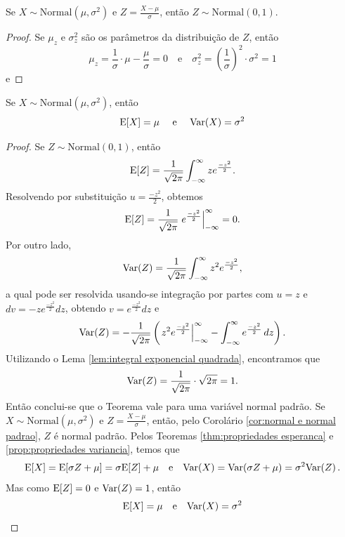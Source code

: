 \begin{cor:normal e normal padrao}
\label{cor:normal e normal padrao}
Se $X \sim \mathrm{Normal}(\mu, \sigma^2)$ e $Z = \frac{X - \mu}{\sigma}$, então
$Z \sim \mathrm{Normal}(0, 1)$.
\end{cor:normal e normal padrao}
\begin{proof}
Se $\mu_z$ e $\sigma^2_z$ são os parâmetros da distribuição de $Z$, então
\[
    \mu_z = \frac{1}{\sigma} \cdot \mu - \frac{\mu}{\sigma} = 0 \quad \text{e} \quad
    \sigma_z^2 = \left(\frac{1}{\sigma}\right)^2 \cdot \sigma^2 = 1
\]
e
\end{proof}

\begin{thm:parametros da normal}
\label{thm:parametros da normal}
Se $X \sim \mathrm{Normal}(\mu, \sigma^2)$, então
\[
    \ev{X} = \mu \quad \text{ e } \quad \var{X} = \sigma^2
\]
\end{thm:parametros da normal}
\begin{proof}
Se $Z \sim \mathrm{Normal}(0, 1)$, então
\[
    \mathrm{E}\!\left[Z\right] = \frac{1}{\sqrt{2\pi}} \int_{-\infty}^\infty z e^{\frac{-z^2}{2}}.
\]
Resolvendo por substituição $u = \frac{-z^2}{2}$, obtemos
\[
    \mathrm{E}\!\left[Z\right] = \frac{1}{\sqrt{2\pi}} \left. e^{\frac{-z^2}{2}} \right|_{-\infty}^\infty = 0.
\]
Por outro lado,
\[
    \mathrm{Var}\!\left(Z\right) = \frac{1}{\sqrt{2\pi}} \int_{-\infty}^\infty z^2 e^{\frac{-z^2}{2}},
\]
a qual pode ser resolvida usando-se integração por partes com $u = z$ e
$dv = -ze^{\frac{-z^2}{2}}dz$, obtendo $v = e^{\frac{-z^2}{2}}dz$ e
\[
    \mathrm{Var}\!\left(Z\right) = -\frac{1}{\sqrt{2\pi}} \left( \left. z^2 e^{\frac{-z^2}{2}} \right|_{-\infty}^\infty -
    \int_{-\infty}^{\infty} e^{\frac{-z^2}{2}}\,dz \right).
\]
Utilizando o Lema \ref{lem:integral exponencial quadrada}, encontramos que
\[
    \mathrm{Var}\!\left(Z\right) = \frac{1}{\sqrt{2\pi}} \cdot \sqrt{2\pi} = 1.
\]
Então conclui-se que o Teorema vale para uma variável normal padrão.
Se $X \sim \mathrm{Normal}(\mu, \sigma^2)$ e $Z = \frac{X - \mu}{\sigma}$, então, pelo Corolário
\ref{cor:normal e normal padrao}, $Z$ é normal padrão.
Pelos Teoremas \ref{thm:propriedades esperanca} e \ref{prop:propriedades variancia}, temos
que
\[
    \mathrm{E}\!\left[X\right] = \mathrm{E}\!\left[\sigma Z + \mu\right] = \sigma \mathrm{E}\!\left[Z\right] + \mu \quad \text{e} \quad
    \mathrm{Var}\!\left(X\right) = \mathrm{Var}\!\left(\sigma Z + \mu\right) = \sigma^2 \mathrm{Var}\!\left(Z\right).
\]
Mas como $\mathrm{E}\!\left[Z\right] = 0$ e $\mathrm{Var}\!\left(Z\right) = 1$, então
\[
    \ev{X} = \mu \quad \text{e} \quad \var{X} = \sigma^2
\]
\end{proof}

